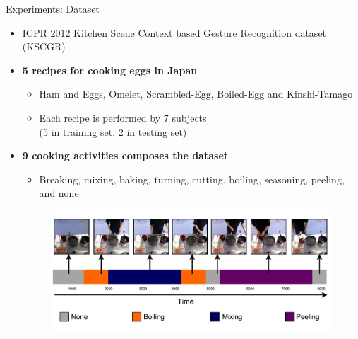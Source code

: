 \documentclass{beamer}
\begin{document}
\begin{frame}{Experiments: Dataset}
   	\begin{itemize}
   		\item ICPR 2012 Kitchen Scene Context based Gesture Recognition dataset (KSCGR)%
	    \item \textbf{5 recipes for cooking eggs in Japan}
   		\begin{itemize}
				\item Ham and Eggs, Omelet, Scrambled-Egg, Boiled-Egg and Kinshi-Tamago
				\item Each recipe is performed by 7 subjects \\(5 in training set, 2 in testing set)
	    \end{itemize}
	    \item \textbf{9 cooking activities composes the dataset}
   		\begin{itemize}
				\item Breaking, mixing, baking, turning, cutting, boiling, seasoning, peeling, and none
	    \end{itemize}
		\begin{figure}[here]
			\centering
			\includegraphics[width=0.7\linewidth]{fig/egg-dataset.pdf}
		\end{figure}
	\end{itemize}
\end{frame}
\end{document}
